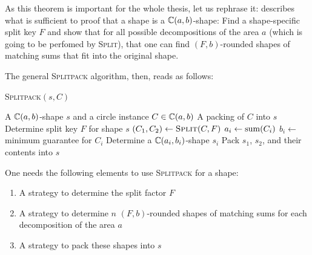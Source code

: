 \documentclass[a4paper,style=print,bibliography=totoc,nexus,lnum,extramargin]{tubsbook}
\begin{document}
As this theorem is important for the whole thesis, let us rephrase it:  describes what is sufficient to proof that a shape is a $\mathbb{C}(a,b)$-shape: Find a shape-specific split key $F$ and show that for all possible decompositions of the area $a$ (which is going to be perfomed by \textsc{Split}), that one can find $(F,b)$-rounded shapes of matching sums that fit into the original shape.

The general \textsc{Splitpack} algorithm, then, reads as follows:

\begin{algorithm}
    \caption{\textsc{Splitpack}$(s,C)$}
    \begin{algorithmic}
        \Require A $\mathbb{C}(a,b)$-shape $s$ and a circle instance $C \in \mathbb{C}(a,b)$
        \Ensure A packing of $C$ into $s$
        \State Determine split key $F$ for shape $s$
        \State $(C_1, C_2) \gets \textsc{Split}(C,F)$
            \State $a_i \gets \operatorname{sum}(C_i)$
            \State $b_i \gets$ minimum guarantee for $C_i$
            \State Determine a $\mathbb{C}(a_i, b_i)$-shape $s_i$
            \State {}
        \EndFor
        \State Pack $s_1$, $s_2$, and their contents into $s$
    \end{algorithmic}
\end{algorithm}

One needs the following elements to use \textsc{Splitpack} for a shape:

\begin{enumerate}
    \item A strategy to determine the split factor $F$
    \item A strategy to determine $n$ $(F,b)$-rounded shapes of matching sums for each decomposition of the area $a$
    \item A strategy to pack these shapes into $s$
\end{enumerate}


\end{document}
